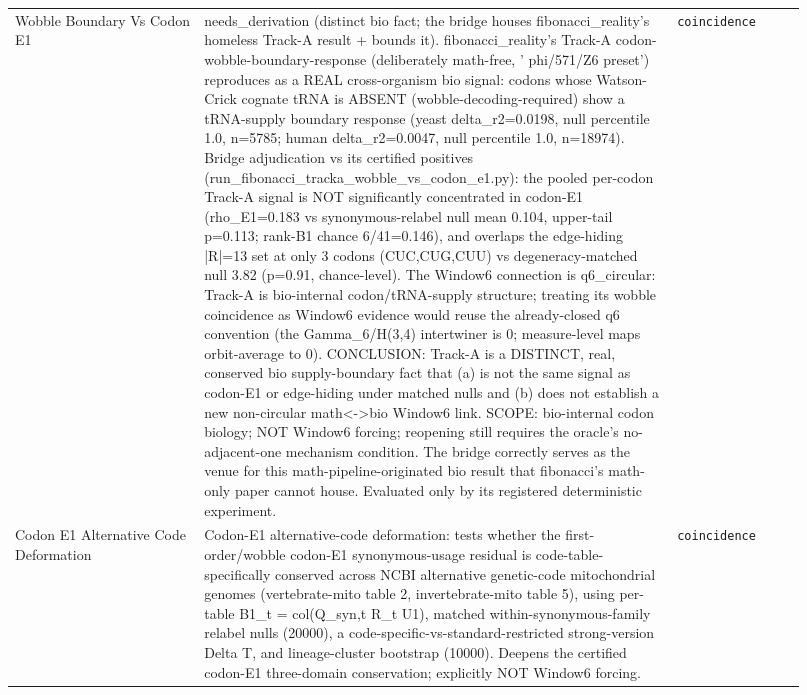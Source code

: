 \begin{longtable}{>{\raggedright\arraybackslash}p{0.22\linewidth}>{\raggedright\arraybackslash}p{0.55\linewidth}>{\raggedright\arraybackslash}p{0.15\linewidth}}
Wobble Boundary Vs Codon E1 & needs\_derivation (distinct bio fact; the bridge houses fibonacci\_reality's homeless Track-A result + bounds it). fibonacci\_reality's Track-A codon-wobble-boundary-response (deliberately math-free, ' phi/571/Z6 preset') reproduces as a REAL cross-organism bio signal: codons whose Watson-Crick cognate tRNA is ABSENT (wobble-decoding-required) show a tRNA-supply boundary response (yeast delta\_r2=0.0198, null percentile 1.0, n=5785; human delta\_r2=0.0047, null percentile 1.0, n=18974). Bridge adjudication vs its certified positives (run\_fibonacci\_tracka\_wobble\_vs\_codon\_e1.py): the pooled per-codon Track-A signal is NOT significantly concentrated in codon-E1 (rho\_E1=0.183 vs synonymous-relabel null mean 0.104, upper-tail p=0.113; rank-B1 chance 6/41=0.146), and overlaps the edge-hiding |R|=13 set at only 3 codons (CUC,CUG,CUU) vs degeneracy-matched null 3.82 (p=0.91, chance-level). The Window6 connection is q6\_circular: Track-A is bio-internal codon/tRNA-supply structure; treating its wobble coincidence as Window6 evidence would reuse the already-closed q6 convention (the Gamma\_6/H(3,4) intertwiner is 0; measure-level maps orbit-average to 0). CONCLUSION: Track-A is a DISTINCT, real, conserved bio supply-boundary fact that (a) is not the same signal as codon-E1 or edge-hiding under matched nulls and (b) does not establish a new non-circular math<->bio Window6 link. SCOPE: bio-internal codon biology; NOT Window6 forcing; reopening still requires the oracle's no-adjacent-one mechanism condition. The bridge correctly serves as the venue for this math-pipeline-originated bio result that fibonacci's math-only paper cannot house. Evaluated only by its registered deterministic experiment. & \texttt{coincidence} \\
Codon E1 Alternative Code Deformation & Codon-E1 alternative-code deformation: tests whether the first-order/wobble codon-E1 synonymous-usage residual is code-table-specifically conserved across NCBI alternative genetic-code mitochondrial genomes (vertebrate-mito table 2, invertebrate-mito table 5), using per-table B1\_t = col(Q\_syn,t R\_t U1), matched within-synonymous-family relabel nulls (20000), a code-specific-vs-standard-restricted strong-version Delta T, and lineage-cluster bootstrap (10000). Deepens the certified codon-E1 three-domain conservation; explicitly NOT Window6 forcing. & \texttt{coincidence} \\

\end{longtable}
